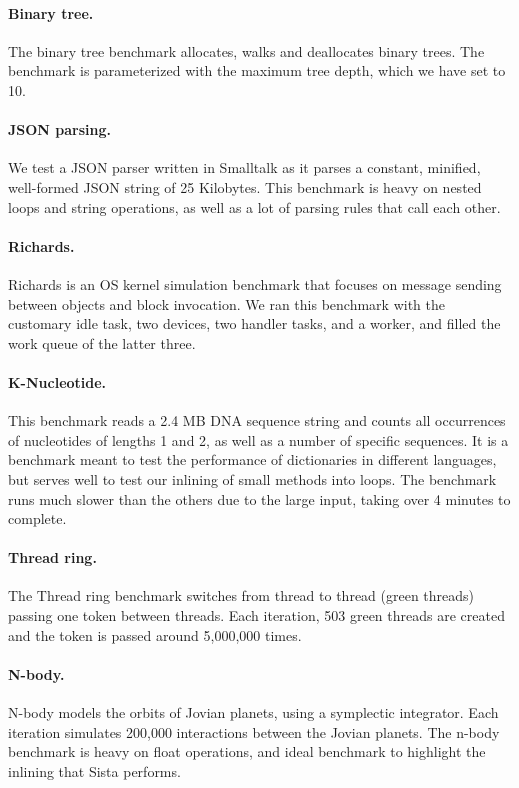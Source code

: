 \documentclass[a4paper,12pt,twoside]{../includes/ThesisStyle}
\begin{document}
	\paragraph{Binary tree.}The binary tree benchmark allocates, walks and deallocates binary trees. The benchmark is parameterized with  the maximum tree depth, which we have set to 10.

	\paragraph{JSON parsing.}We test a JSON parser written in Smalltalk as it parses a constant, minified, well-formed JSON string of 25 Kilobytes. This benchmark is heavy on nested loops and string operations, as well as a lot of parsing rules that call each other.

	\paragraph{Richards.}Richards is an OS kernel simulation benchmark that focuses on message sending between objects and block invocation. We ran this benchmark with the customary idle task, two devices, two handler tasks, and a worker, and filled the work queue of the latter three.

	\paragraph{K-Nucleotide.}This benchmark reads a 2.4 MB DNA sequence string and counts all occurrences of nucleotides of lengths 1 and 2, as well as a number of specific sequences. It is a benchmark meant to test the performance of dictionaries in different languages, but serves well to test our inlining of small methods into loops. The benchmark runs much slower than the others due to the large input, taking over 4 minutes to complete.

	\paragraph{Thread ring.}The Thread ring benchmark switches from thread to thread (green threads) passing one token between threads. Each iteration, 503 green threads are created and the token is passed around 5,000,000 times.

	\paragraph{N-body.}N-body models the orbits of Jovian planets, using a symplectic integrator. Each iteration simulates 200,000 interactions between the Jovian planets. The n-body benchmark is heavy on float operations, and ideal benchmark to highlight the inlining that Sista performs.
\end{document}
